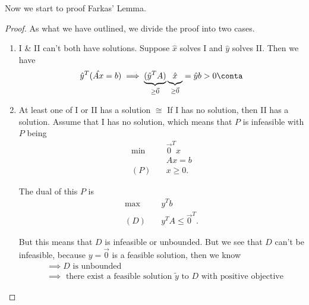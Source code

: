 Now we start to proof Farkas' Lemma.
\begin{proof}
	As what we have outlined, we divide the proof into two cases.
	\begin{enumerate}
		\item I \& II can't both have solutions. Suppose \(\hat{x}\) solves I and \(\hat{y}\) solves II. Then we have
		      \[
			      \hat{y}^{T}(\hat{Ax} = b) \implies \underbrace{(\hat{y}^{T} A)}_{\geq  \vec{0}}\underbrace{\vphantom{\hat{y}^{T}}\hat{x}}_{\geq  \vec{0}} = \hat{y} b > 0\conta
		      \]
		\item At least one of I or II has a solution \(\cong\) If I has no solution, then II has a solution. Assume that I has no solution, which
		      means that \(P\) is infeasible with \(P\) being
		      \begin{align*}
			      \min~    & \vec{0}^{T} x \\
			               & Ax = b        \\
			      (P)\quad & x\geq 0.
		      \end{align*}

		      The dual of this \(P\) is
		      \begin{align*}
			      \max~    & y^{T}b                    \\
			      (D)\quad & y^{T} A \leq \vec{0}^{T}.
		      \end{align*}

		      But this means that \(D\) is infeasible or unbounded.	But we see that \(D\) can't be infeasible, because \(y = \vec{0}\) is a
		      feasible solution, then we know
		      \[
			      \begin{split}
				      &\implies D \text{ is unbounded} \\
				      &\implies \text{ there exist a feasible solution \(\widetilde{y}\) to \(D\) with positive objective}
			      \end{split}
		      \]
	\end{enumerate}
\end{proof}

